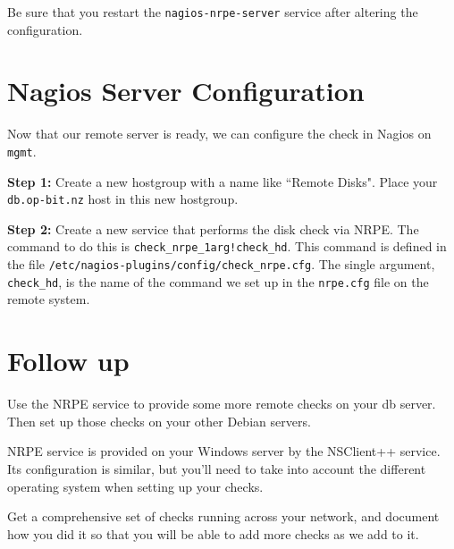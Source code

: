 \documentclass{article}   	%
\begin{document}
Be sure that you restart the \texttt{nagios-nrpe-server} service after altering the configuration.

\section{Nagios Server Configuration}
Now that our remote server is ready, we can configure the check in Nagios on \texttt{mgmt}.

\textbf{Step 1:} Create a new hostgroup with a name like ``Remote Disks".  Place your \texttt{db.op-bit.nz} host in this new hostgroup.

\textbf{Step 2:}  Create a new service that performs the disk check via NRPE.  The command to do this is \texttt{check\_nrpe\_1arg!check\_hd}.  This command is defined in the file \texttt{/etc/nagios-plugins/config/check\_nrpe.cfg}.  The single argument, \texttt{check\_hd}, is the name of the command we set up in the \texttt{nrpe.cfg} file on the remote system.

\section{Follow up}
Use the NRPE service to provide some more remote checks on your db server.  Then set up those checks on your other Debian servers.

NRPE service is provided on your Windows server by the NSClient++ service.  Its configuration is similar, but you'll need to take into account the different operating system when setting up your checks.

Get a comprehensive set of checks running across your network, and document how you did it so that you will be able to add more checks as we add to it.
\end{document}
